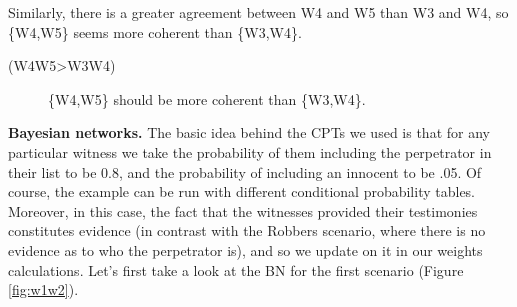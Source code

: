 \documentclass[
  10pt,
]{scrartcl}
\newcommand{\s}[1]{\textsf{#1}}
\begin{document}
Similarly, there is a greater agreement between \s{W4} and \s{W5} than \s{W3} and \s{W4}, so \{\s{W4},\s{W5}\} seems more coherent than \{\s{W3},\s{W4}\}.
\vspace{2mm}

\begin{description}
    \item[(\s{W4W5\textgreater W3W4})] \{\s{W4},\s{W5}\} should be more coherent than \{\s{W3},\s{W4}\}.
\end{description}\vspace{2mm}

\noindent \textbf{Bayesian networks.} The basic idea behind the CPTs we used is that for any particular witness we take the probability of them including the perpetrator in their list to be 0.8, and the probability of including an innocent to be .05. Of course, the example can be run with different conditional probability tables. Moreover, in this case, the fact that the witnesses provided their testimonies constitutes evidence (in contrast with the Robbers scenario, where there is no evidence as to who the perpetrator is), and so we update on it in our weights calculations. Let's first take a look at the BN for the first scenario (Figure \ref{fig:w1w2}).

\vspace{1mm}
\footnotesize

\normalsize
\end{document}
